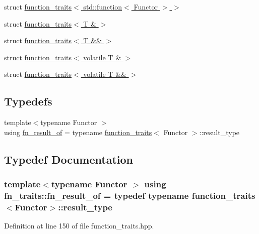 \begin{DoxyCompactItemize}
\item 
struct \hyperlink{structfn__traits_1_1function__traits_3_01std_1_1function_3_01_functor_01_4_01_4}{function\+\_\+traits$<$ std\+::function$<$ Functor $>$ $>$}
\item 
struct \hyperlink{structfn__traits_1_1function__traits_3_01_t_01_6_01_4}{function\+\_\+traits$<$ T \& $>$}
\item 
struct \hyperlink{structfn__traits_1_1function__traits_3_01_t_01_6_6_01_4}{function\+\_\+traits$<$ T \&\& $>$}
\item 
struct \hyperlink{structfn__traits_1_1function__traits_3_01volatile_01_t_01_6_01_4}{function\+\_\+traits$<$ volatile T \& $>$}
\item 
struct \hyperlink{structfn__traits_1_1function__traits_3_01volatile_01_t_01_6_6_01_4}{function\+\_\+traits$<$ volatile T \&\& $>$}
\end{DoxyCompactItemize}
\subsection*{Typedefs}
\begin{DoxyCompactItemize}
\item 
{\footnotesize template$<$typename Functor $>$ }\\using \hyperlink{namespacefn__traits_adcf00e6412a39682ecf07be3958762f6}{fn\+\_\+result\+\_\+of} = typename \hyperlink{structfn__traits_1_1function__traits}{function\+\_\+traits}$<$ Functor $>$\+::result\+\_\+type
\end{DoxyCompactItemize}


\subsection{Typedef Documentation}
\subsubsection[{\texorpdfstring{fn\+\_\+result\+\_\+of}{fn_result_of}}]{\setlength{\rightskip}{0pt plus 5cm}template$<$typename Functor $>$ using {\bf fn\+\_\+traits\+::fn\+\_\+result\+\_\+of} = typedef typename {\bf function\+\_\+traits}$<$Functor$>$\+::result\+\_\+type}\hypertarget{namespacefn__traits_adcf00e6412a39682ecf07be3958762f6}{}\label{namespacefn__traits_adcf00e6412a39682ecf07be3958762f6}


Definition at line 150 of file function\+\_\+traits.\+hpp.


